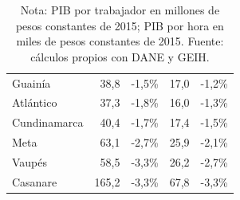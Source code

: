 \begin{table}[H]
\begin{tabular}{lrrrr}
Guainía & 38,8 & -1,5\% & 17,0 & -1,2\% \\
Atlántico & 37,3 & -1,8\% & 16,0 & -1,3\% \\
Cundinamarca & 40,4 & -1,7\% & 17,4 & -1,5\% \\
Meta & 63,1 & -2,7\% & 25,9 & -2,1\% \\
Vaupés & 58,5 & -3,3\% & 26,2 & -2,7\% \\
Casanare & 165,2 & -3,3\% & 67,8 & -3,3\% \\
\bottomrule
\end{tabular}
\caption*{\footnotesize Nota: PIB por trabajador en millones de pesos constantes de 2015; PIB por hora en miles de pesos constantes de 2015. Fuente: cálculos propios con DANE y GEIH.}
\end{table}